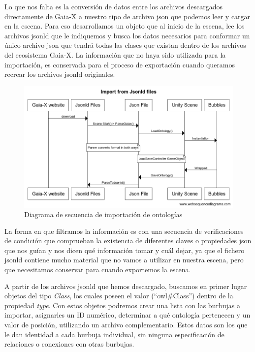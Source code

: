 Lo que nos falta es la conversión de datos entre los archivos descargados directamente de Gaia-X a nuestro tipo de archivo json que podemos leer y cargar en la escena. Para eso desarrollamos un objeto que al inicio de la escena, lee los archivos jsonld que le indiquemos y busca los datos necesarios para conformar un único archivo json que tendrá todas las clases que existan dentro de los archivos del ecosistema Gaia-X. La información que no haya sido utilizada para la importación, es conservada para el proceso de exportación cuando queramos recrear los archivos jsonld originales.

\begin{figure}[ht]
   \begin{center}
      \includegraphics[width=0.9\linewidth]{chapter2/figures/import.png}
   \end{center}
   \caption[Diagrama de secuencia de importación de ontologías]
   {\footnotesize Diagrama de secuencia de importación de ontologías}
\end{figure}

La forma en que filtramos la información es con una secuencia de verificaciones de condición que comprueban la existencia de diferentes claves o propiedades json que nos guían y nos dicen qué información tomar y cuál dejar, ya que el fichero jsonld contiene mucho material que no vamos a utilizar en nuestra escena, pero que necesitamos conservar para cuando exportemos la escena.

A partir de los archivos jsonld que hemos descargado, buscamos en primer lugar objetos del tipo \textit{Class}, los cuales poseen el valor (``owl\#Class'') dentro de la propiedad \textit{type}. Con estos objetos podremos crear una lista con las burbujas a importar, asignarles un ID numérico, determinar a qué ontología pertenecen y un valor de posición, utilizando un archivo complementario. Estos datos son los que le dan identidad a cada burbuja individual, sin ninguna especificación de relaciones o conexiones con otras burbujas.

